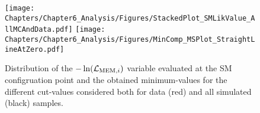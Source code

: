 \begin{figure}[h!t]
 \centering
 \texttt{[image: Chapters/Chapter6\_Analysis/Figures/StackedPlot\_SMLikValue\_AllMCAndData.pdf]}
 \texttt{[image: Chapters/Chapter6\_Analysis/Figures/MinComp\_MSPlot\_StraightLineAtZero.pdf]}            %
 \caption{Distribution of the $-\ln(\mathcal{L}_{\textrm{MEM}, i})$ variable evaluated at the SM configruation point and the obtained minimum-values for the different cut-values considered both for data (red) and all simulated (black) samples.}
\end{figure}
